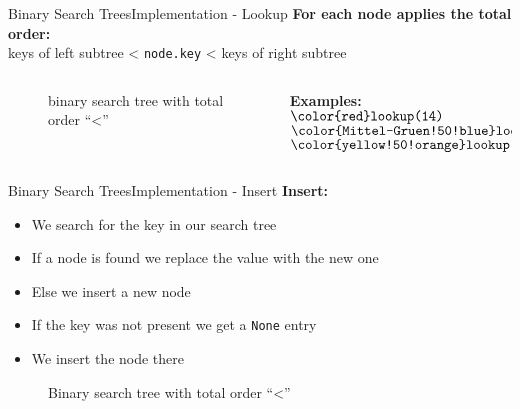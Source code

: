 \begin{frame}{Binary Search Trees}{Implementation - Lookup}
  \textbf{For each node applies the total order:}\\
  \hspace{1.5em}keys of left subtree
  < \texttt{\color{Mittel-Blau}node.key} < keys of right
  subtree
  \begin{columns}
    \begin{column}{0.8\linewidth}
      \begin{figure}
        \begin{adjustbox}{width=\linewidth}
          
        \end{adjustbox}
        \caption{binary search tree with total order
          \enquote{\color{Mittel-Blau}<}}
        \label{fig:binary_search_trees:binary_tree_lookup}
      \end{figure}
    \end{column}
    \begin{column}{0.2\linewidth}
      \textbf{Examples:}\\[1em]
      $\rlap\text\texttt{\color{red}lookup(14)}$\\[0.5em]
      $\rlap\text\texttt{\color{Mittel-Gruen!50!blue}lookup(6)}$
        \\[0.5em]
      $\rlap\text\texttt{\color{yellow!50!orange}lookup(19)}$
    \end{column}
  \end{columns}
\end{frame}


\begin{frame}{Binary Search Trees}{Implementation - Insert}
  \textbf{Insert:}
  \begin{itemize}
    \item<2->
      We search for the key in our search tree
    \item<3->
      If a node is found we replace the value with the new one
    \item<4->
      Else we insert a new node
    \item<5->If the key was not present we get a \texttt{\color{Mittel-Blau}None} entry
    \item<6->We insert the node there
  \end{itemize}
  \vspace{-1em}
  \begin{figure}
    
    \caption{Binary search tree with total order
      \enquote{\color{Mittel-Blau}<}}
    \label{fig:binary_search_trees:binary_tree_insert}
  \end{figure}
\end{frame}

